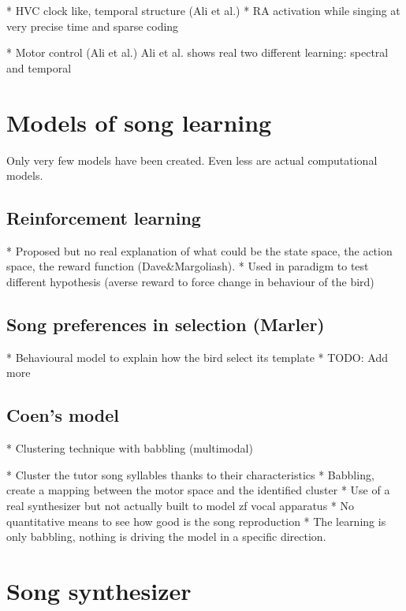 \documentclass{report}
\begin{document}
  * HVC clock like, temporal structure (Ali et al.)
  * RA activation while singing at very precise time and sparse coding

        * Motor control (Ali et al.) Ali et al. shows real two different
    learning: spectral and temporal

\section{Models of song learning} \label{models-of-song-learning}

Only very few models have been created. Even less are actual
computational models.

\subsection{Reinforcement learning} \label{reinforcement-learning}

  * Proposed but no real explanation of what could be the state space, the
  action space, the reward function (Dave\&Margoliash).
  * Used in paradigm to test different hypothesis (averse reward to force
  change in behaviour of the bird)

\subsection{Song preferences in selection
(Marler)} \label{song-preferences-in-selection-marler}

  * Behavioural model to explain how the bird select its template
  * TODO: Add more

\subsection{Coen's model} \label{coens-model}

  * Clustering technique with babbling (multimodal)

      * Cluster the tutor song syllables thanks to their characteristics
      * Babbling, create a mapping between the motor space and the
    identified cluster
    * Use of a real synthesizer but not actually built to model zf vocal
  apparatus
  * No quantitative means to see how good is the song reproduction
  * The learning is only babbling, nothing is driving the model in a
  specific direction.

\section{Song synthesizer}\label{song-synthesizer}
\end{document}
